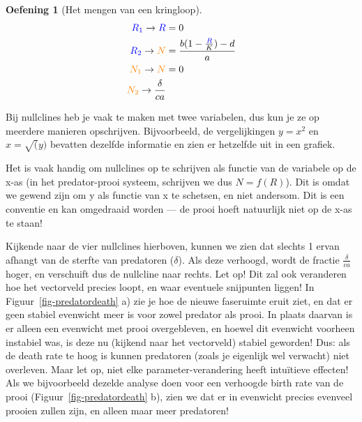 \documentclass[
  a4paper,
]{scrbook}
\theoremstyle{definition}
\newtheorem{exercise}{Oefening}[chapter]
\theoremstyle{remark}
\begin{document}
\begin{exercise}[Het mengen van een
kringloop]
\begin{align*}
    \color{blue}R_{1}\color{black} \rightarrow \color{blue}R &= 0 \\
    \color{blue}R_{2}\color{black} \rightarrow \color{orange}N\color{black} &= \frac{b(1-\frac{\color{blue}R}{K})\color{black} - d}{a} \\
    \color{orange}N_{1}\color{black} \rightarrow \color{orange}N\color{black} &= 0 \\
    \color{orange}N_{2}\color{black} \rightarrow \frac{\delta}{ca}
\end{align*}

\begin{tcolorbox}[enhanced jigsaw, rightrule=.15mm, opacityback=0, leftrule=.75mm, title=\textcolor{quarto-callout-warning-color}{\faExclamationTriangle}\hspace{0.5em}{Een nullclines gegeven door X = \ldots, is niet altijd de nullcline voor
X!}, toptitle=1mm, titlerule=0mm, opacitybacktitle=0.6, colframe=quarto-callout-warning-color-frame, breakable, colbacktitle=quarto-callout-warning-color!10!white, coltitle=black, toprule=.15mm, bottomrule=.15mm, left=2mm, bottomtitle=1mm, arc=.35mm, colback=white]

Bij nullclines heb je vaak te maken met twee variabelen, dus kun je ze
op meerdere manieren opschrijven. Bijvoorbeeld, de vergelijkingen
\(y=x^2\) en \(x=\sqrt(y)\) bevatten dezelfde informatie en zien er
hetzelfde uit in een grafiek.

Het is vaak handig om nullclines op te schrijven als functie van de
variabele op de x-as (in het predator-prooi systeem, schrijven we dus
\(N=f(R)\)). Dit is omdat we gewend zijn om y als functie van x te
schetsen, en niet andersom. Dit is een conventie en kan omgedraaid
worden --- de prooi hoeft natuurlijk niet op de x-as te staan!

\end{tcolorbox}

Kijkende naar de vier nullclines hierboven, kunnen we zien dat slechts 1
ervan afhangt van de sterfte van predatoren (\(\delta\)). Als deze
verhoogd, wordt de fractie \(\frac{\delta}{ca}\) hoger, en verschuift
dus de nullcline naar rechts. Let op! Dit zal ook veranderen hoe het
vectorveld precies loopt, en waar eventuele snijpunten liggen! In
Figuur~\ref{fig-predatordeath} a) zie je hoe de nieuwe faseruimte eruit
ziet, en dat er geen stabiel evenwicht meer is voor zowel predator als
prooi. In plaats daarvan is er alleen een evenwicht met prooi
overgebleven, en hoewel dit evenwicht voorheen instabiel was, is deze nu
(kijkend naar het vectorveld) stabiel geworden! Dus: als de death rate
te hoog is kunnen predatoren (zoals je eigenlijk wel verwacht) niet
overleven. Maar let op, niet elke parameter-verandering heeft intuïtieve
effecten! Als we bijvoorbeeld dezelde analyse doen voor een verhoogde
birth rate van de prooi (Figuur~\ref{fig-predatordeath} b), zien we dat
er in evenwicht precies evenveel prooien zullen zijn, en alleen maar
meer predatoren!


\end{exercise}
\end{document}
